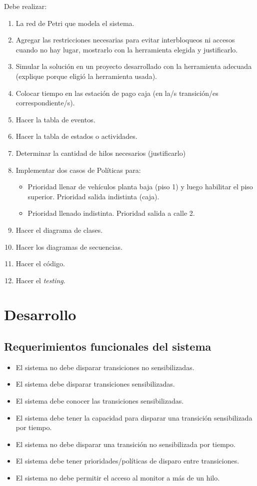 \documentclass[12pt,a4paper]{article}
\begin{document}
Debe realizar:
\begin{enumerate}
\item La red de Petri que modela el sistema.
\item Agregar las restricciones necesarias para evitar interbloqueos ni accesos cuando no hay lugar, mostrarlo con la herramienta elegida y justificarlo.
\item Simular la solución en un proyecto desarrollado con la herramienta adecuada (explique porque eligió la herramienta usada).
\item Colocar tiempo en las estación de pago caja (en la/s transición/es correspondiente/s).
\item Hacer la tabla de eventos.
\item Hacer la tabla de estados o actividades.
\item Determinar la cantidad de hilos necesarios (justificarlo)
\item Implementar dos casos de Políticas para:

\begin{itemize}
\item Prioridad llenar de vehículos planta baja (piso 1) y luego habilitar el piso superior. Prioridad salida indistinta (caja).
\item Prioridad llenado indistinta. Prioridad salida a calle 2.
\end{itemize}

\item Hacer el diagrama de clases.
\item Hacer los diagramas de secuencias.
\item Hacer el código.
\item Hacer el \emph{testing}.
\end{enumerate}

\section{Desarrollo}
\label{desarrollo}

\subsection{Requerimientos funcionales del sistema}
\begin{itemize}[leftmargin=1.5cm]
    \item El sistema no debe disparar transiciones no sensibilizadas.
    \item El sistema debe disparar transiciones sensibilizadas.
    \item El sistema debe conocer las transiciones sensibilizadas.
    \item El sistema debe tener la capacidad para disparar una transición sensibilizada por tiempo.
    \item El sistema no debe disparar una transición no sensibilizada por tiempo.
    \item El sistema debe tener prioridades/políticas de disparo entre transiciones.
    \item El sistema no debe permitir el acceso al monitor a más de un hilo.
\end{itemize}
\end{document}
